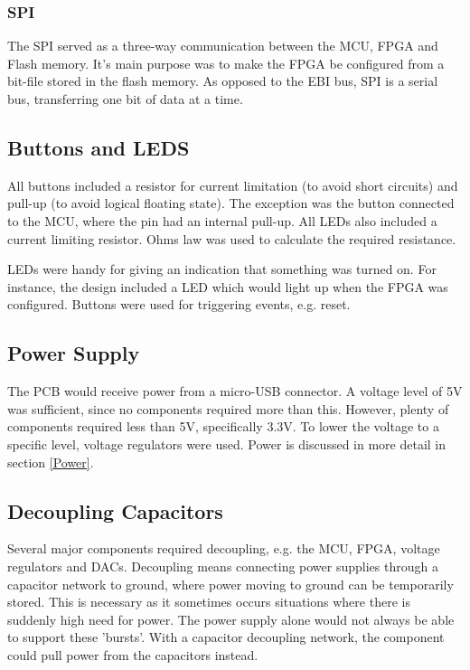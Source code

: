 \subsubsection{SPI}
The SPI served as a three-way communication between the MCU, FPGA and Flash memory.
It's main purpose was to make the FPGA be configured from a bit-file stored in the flash memory.
As opposed to the EBI bus, SPI is a serial bus, transferring one bit of data at a time.

\subsection{Buttons and LEDS}
All buttons included a resistor for current limitation (to avoid short circuits) and pull-up (to avoid logical floating state).
The exception was the button connected to the MCU, where the pin had an internal pull-up.
All LEDs also included a current limiting resistor. 
Ohms law was used to calculate the required resistance\cite{ohm}.

LEDs were handy for giving an indication that something was turned on. 
For instance, the design included a LED which would light up when the FPGA was configured.
Buttons were used for triggering events, e.g. reset.

\subsection{Power Supply}
The PCB would receive power from a micro-USB connector. 
A voltage level of 5V was sufficient, since no components required more than this. 
However, plenty of components required less than 5V, specifically 3.3V. 
To lower the voltage to a specific level, voltage regulators were used. 
Power is discussed in more detail in section \ref{Power}.

\subsection{Decoupling Capacitors}
Several major components required decoupling, e.g. the MCU, FPGA, voltage regulators and DACs.
Decoupling means connecting power supplies through a capacitor network to ground, where power moving to ground can be temporarily stored.
This is necessary as it sometimes occurs situations where there is suddenly high need for power.
The power supply alone would not always be able to support these 'bursts'.
With a capacitor decoupling network, the component could pull power from the capacitors instead.


